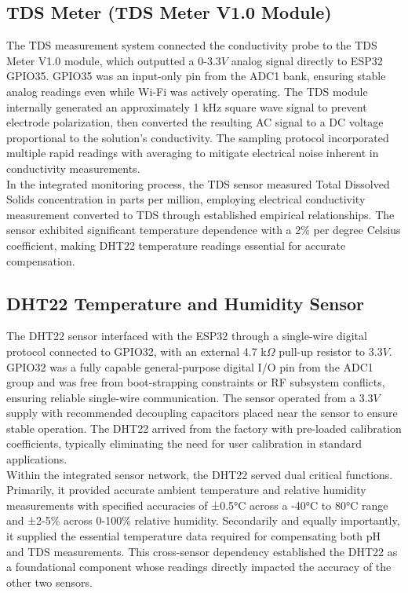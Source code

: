 \subsection{TDS Meter (TDS Meter V1.0 Module)}
The TDS measurement system connected the conductivity probe to the TDS Meter V1.0 module, which outputted a 0-$3.3V$ analog signal directly to ESP32 GPIO35. GPIO35 was an input-only pin from the ADC1 bank, ensuring stable analog readings even while Wi-Fi was actively operating. The TDS module internally generated an approximately 1 kHz square wave signal to prevent electrode polarization, then converted the resulting AC signal to a DC voltage proportional to the solution's conductivity. The sampling protocol incorporated multiple rapid readings with averaging to mitigate electrical noise inherent in conductivity measurements.\\[8pt]
In the integrated monitoring process, the TDS sensor measured Total Dissolved Solids concentration in parts per million, employing electrical conductivity measurement converted to TDS through established empirical relationships. The sensor exhibited significant temperature dependence with a 2\% per degree Celsius coefficient, making DHT22 temperature readings essential for accurate compensation.

\subsection{DHT22 Temperature and Humidity Sensor}
The DHT22 sensor interfaced with the ESP32 through a single-wire digital protocol connected to GPIO32, with an external 4.7 k$\Omega$ pull-up resistor to $3.3V$. GPIO32 was a fully capable general-purpose digital I/O pin from the ADC1 group and was free from boot-strapping constraints or RF subsystem conflicts, ensuring reliable single-wire communication. The sensor operated from a $3.3V$ supply with recommended decoupling capacitors placed near the sensor to ensure stable operation. The DHT22 arrived from the factory with pre-loaded calibration coefficients, typically eliminating the need for user calibration in standard applications.\\[8pt]
Within the integrated sensor network, the DHT22 served dual critical functions. Primarily, it provided accurate ambient temperature and relative humidity measurements with specified accuracies of ±0.5°C across a -40°C to 80°C range and ±2-5\% across 0-100\% relative humidity. Secondarily and equally importantly, it supplied the essential temperature data required for compensating both pH and TDS measurements. This cross-sensor dependency established the DHT22 as a foundational component whose readings directly impacted the accuracy of the other two sensors.

